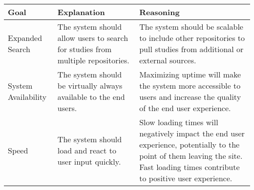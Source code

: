 \documentclass{article}
\begin{document}
\begin{table}[H]
\centering
\begin{tabular}{| p{3cm} | p{5cm} | p{5cm} |}
\hline
Goal & Explanation & Reasoning \\
\hline  \hline
Expanded Search & The system should allow users to search for studies from multiple repositories. & The system should be scalable to include other repositories to pull studies from additional or external sources. \\
\hline
System Availability & The system should be virtually always available to the end users. & Maximizing uptime will make the system more accessible to users and increase the quality of the end user experience. \\
\hline
Speed & The system should load and react to user input quickly. &  Slow loading times will negatively impact the end user experience, potentially to the point of them leaving the site. Fast loading times contribute to positive user experience. \\
\hline
\end{tabular}
\end{table}
\end{document}
